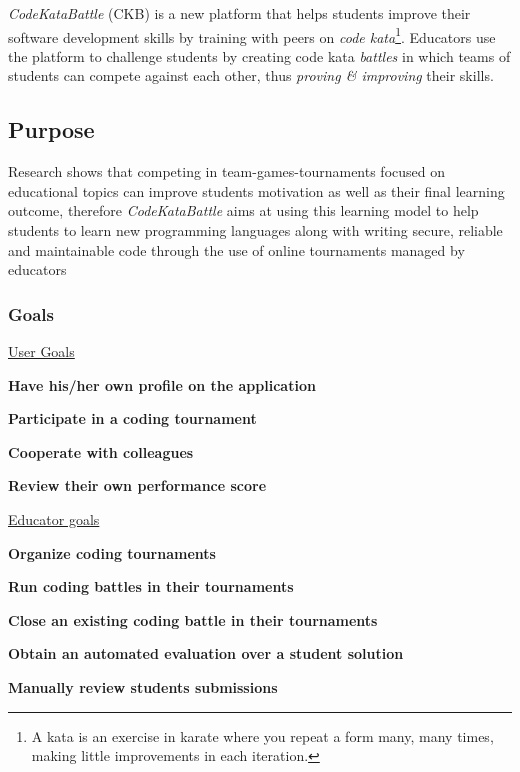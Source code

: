 \documentclass[../RASD.tex]{subfiles}
\begin{document}


    \setcounter{rown2}{1}
    \newcommand{\rowIndez}{\arabic{rown2}\stepcounter{rown2}}

    \textit{CodeKataBattle} (CKB) is a new platform that helps students improve their software development skills by training with peers on \textit{code kata}\footnote{A kata is an exercise in karate where you repeat a form many, many times, making little improvements in each iteration.}.
    Educators use the platform to challenge students by creating code kata \textit{battles} in which teams of students can compete against each other, thus \textit{proving \& improving} their skills.
    \subsection{Purpose} \label{subsec:purpose}
        Research shows that competing in team-games-tournaments focused on educational topics can improve students motivation\cite{TGTMotivation} as well as their final learning outcome\cite{TGTOutcome}, therefore \textit{CodeKataBattle} aims at using this learning model to help students to learn new programming languages along with writing secure, reliable and maintainable code through the use of online tournaments managed by educators
    \subsubsection{Goals} \label{subsubsec:goals}
        \underline{User Goals}
        \begin{glist}
            \item \textbf{Have his/her own profile on the application}
            \item \textbf{Participate in a coding tournament}
            \item \textbf{Cooperate with colleagues}
            \item \textbf{Review their own performance score}
        \end{glist}
        \underline{Educator goals}
        \begin{glist} [start = 5]
            \item \textbf{Organize coding tournaments}
            \item \textbf{Run coding battles in their tournaments}
            \item \textbf{Close an existing coding battle in their tournaments}
            \item \textbf{Obtain an automated evaluation over a student solution}
            \item \textbf{Manually review students submissions}
        \end{glist}\newpage
\end{document}
